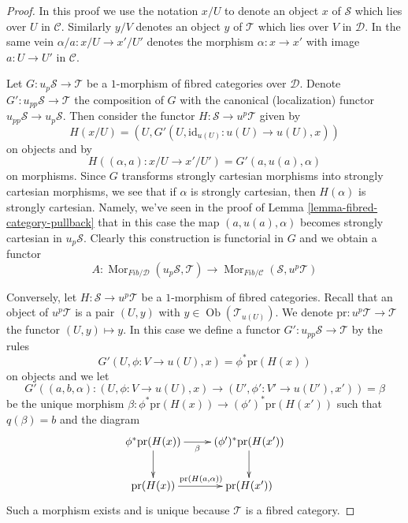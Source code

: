 \documentclass{stacks-project}
\theoremstyle{plain}
\theoremstyle{definition}
\theoremstyle{remark}
\numberwithin{equation}{subsection}
\def\Mor{\mathop{\mathrm{Mor}}\nolimits}
\def\Ob{\mathop{\mathrm{Ob}}\nolimits}
\begin{document}
\begin{proof}
In this proof we use the notation $x/U$ to denote an object
$x$ of $\mathcal{S}$ which lies over $U$ in $\mathcal{C}$.
Similarly $y/V$ denotes an object $y$ of $\mathcal{T}$
which lies over $V$ in $\mathcal{D}$. In the same vein
$\alpha/a : x/U \to x'/U'$ denotes the morphism
$\alpha : x \to x'$ with image $a : U \to U'$ in $\mathcal{C}$.

\medskip\noindent
Let $G : u_p\mathcal{S} \to \mathcal{T}$ be a $1$-morphism of fibred
categories over $\mathcal{D}$. Denote $G' : u_{pp}\mathcal{S} \to \mathcal{T}$
the composition of $G$ with the canonical (localization) functor
$u_{pp}\mathcal{S} \to u_p\mathcal{S}$. Then consider the functor
$H : \mathcal{S} \to u^p\mathcal{T}$ given by
$$
H(x/U) = (U, G'(U, \text{id}_{u(U)} : u(U) \to u(U), x))
$$
on objects and by
$$
H((\alpha, a) : x/U \to x'/U') = G'(a, u(a), \alpha)
$$
on morphisms. Since $G$ transforms strongly cartesian morphisms
into strongly cartesian morphisms, we see that if $\alpha$ is strongly
cartesian, then $H(\alpha)$ is strongly cartesian.
Namely, we've seen in the proof of
Lemma \ref{lemma-fibred-category-pullback}
that in this case the map $(a, u(a), \alpha)$ becomes
strongly cartesian in $u_p\mathcal{S}$. Clearly this construction is
functorial in $G$ and we obtain a functor
$$
A :
\Mor_{\textit{Fib}/\mathcal{D}}(u_p\mathcal{S}, \mathcal{T})
\longrightarrow
\Mor_{\textit{Fib}/\mathcal{C}}(\mathcal{S}, u^p\mathcal{T})
$$

\medskip\noindent
Conversely, let $H : \mathcal{S} \to u^p\mathcal{T}$ be a $1$-morphism
of fibred categories. Recall that an object of $u^p\mathcal{T}$ is
a pair $(U, y)$ with $y \in \Ob(\mathcal{T}_{u(U)})$. We denote
$\text{pr} : u^p\mathcal{T} \to \mathcal{T}$ the functor $(U, y) \mapsto y$.
In this case we define a functor
$G' : u_{pp}\mathcal{S} \to \mathcal{T}$ by the rules
$$
G'(U, \phi : V \to u(U), x) = \phi^*\text{pr}(H(x))
$$
on objects and we let
$$
G'((a, b, \alpha) : (U, \phi : V \to u(U), x)
\to (U', \phi' : V' \to u(U'), x'))
=
\beta
$$
be the unique morphism
$\beta : \phi^*\text{pr}(H(x)) \to (\phi')^*\text{pr}(H(x'))$
such that $q(\beta) = b$ and the diagram
$$
\xymatrix{
\phi^*\text{pr}(H(x)) \ar[d] \ar[r]_-{\beta} &
(\phi')^*\text{pr}(H(x')) \ar[d] \\
\text{pr}(H(x)) \ar[r]^{\text{pr}(H(a, \alpha))} & \text{pr}(H(x'))
}
$$
Such a morphism exists and is unique because $\mathcal{T}$ is a fibred
category.


\end{proof}
\end{document}
